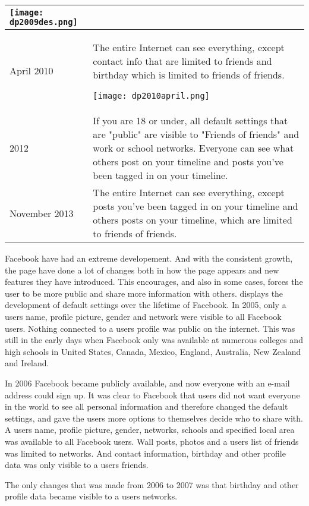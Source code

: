 \begin{center}
\begin{longtable}{ | l | p{9cm} |}
    \texttt{[image: dp2009des.png]}\\
    \hline
    April 2010 & The entire Internet can see everything, except contact info that are limited to friends and birthday which is limited to friends of friends.
    
    \texttt{[image: dp2010april.png]} \\
    \hline
    2012 & If you are 18 or under, all default settings that are "public" are visible to "Friends of friends" and work or school networks. Everyone can see what others post on your timeline and posts you've been tagged in on your timeline.\\
    \hline
    November 2013 & The entire Internet can see everything, except posts you've been tagged in on your timeline and others posts on your timeline, which are limited to friends of friends. \\ 
    \hline
   \end{longtable}
\end{center}  

Facebook have had an extreme developement. And with the consistent growth, the page have done a lot of changes both in how the page appears and new features they have introduced. This encourages, and also in some cases, forces the user to be more public and share more information with others.  displays the development of default settings over the lifetime of Facebook. In 2005, only a users name, profile picture, gender and network were visible to all Facebook users. Nothing connected to a users profile was public on the internet. This was still in the early days when Facebook only was available at numerous colleges and high schools in United States, Canada, Mexico, England, Australia, New Zealand and Ireland.

In 2006 Facebook became publicly available, and now everyone with an e-mail address could sign up. It was clear to Facebook that users did not want everyone in the world to see all personal information and therefore changed the default settings, and gave the users more options to themselves decide who to share with. A users name, profile picture, gender, networks, schools and specified local area was available to all Facebook users. Wall posts, photos and a users list of friends was limited to networks. And contact information, birthday and other profile data was only visible to a users friends. 

The only changes that was made from 2006 to 2007 was that birthday and other profile data became visible to a users networks.

